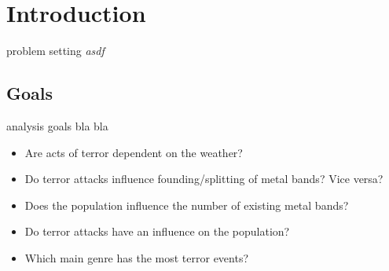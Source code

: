 
\section{Introduction}


problem setting
\emph{asdf}




\subsection{Goals}
analysis goals bla bla

\begin{itemize}
	\item Are acts of terror dependent on the weather?
	\item Do terror attacks influence founding/splitting of metal bands? Vice versa?
	\item Does the population influence the number of existing metal bands?
	\item Do terror attacks have an influence on the population?
	\item Which main genre has the most terror events?
\end{itemize}




